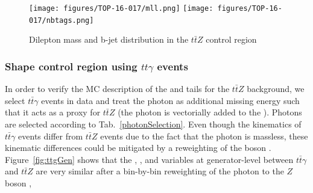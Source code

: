     \begin{figure}
      \centering
      \texttt{[image: figures/TOP-16-017/mll.png]}
      \texttt{[image: figures/TOP-16-017/nbtags.png]}
      \caption{Dilepton mass and b-jet distribution in the $t\bar{t}Z$ control region~\citep{CMS-PAS-TOP-16-017}}
      \label{fig:ttz3l}
    \end{figure}


  \subsubsection{Shape control region using \texorpdfstring{$tt\gamma$}{ttg} events}
    In order to verify the MC description of the \met and \mtll tails for the $t\bar{t}Z$ background, we select $t\bar{t}\gamma$ events in data and treat the photon \pt as additional missing energy
    such that it acts as a proxy for $t\bar{t}Z$ (\ie the photon \pt is vectorially added to the \met). Photons are selected according to Tab.~\ref{photonSelection}. Even though the kinematics of $t\bar{t}\gamma$ events differ from $t\bar{t}Z$ events due to the fact that the photon is massless, these kinematic
    differences could be mitigated by a reweighting of the boson \pt. Figure~\ref{fig:ttgGen} shows that the \met, \mtll, \mtlblb and \mtbb variables at generator-level between $t\bar{t}\gamma$ and $t\bar{t}Z$ are very similar
    after a bin-by-bin reweighting of the photon \pt to the $Z$ boson \pt,

